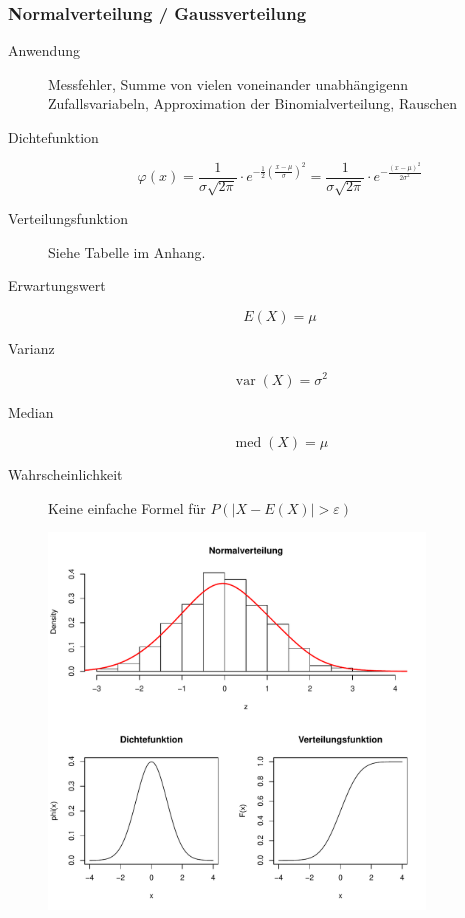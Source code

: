 \subsubsection{Normalverteilung / Gaussverteilung}
\begin{description}
  \item[Anwendung] Messfehler, Summe von vielen voneinander
    unabhängigenn Zufallsvariabeln, Approximation der
    Binomialverteilung, Rauschen
  \item[Dichtefunktion] \[\varphi(x) = \frac{1}{\sigma \sqrt{2\pi}} \cdot
    e^{-\frac{1}{2}{\left(\frac{x-\mu}{\sigma}\right)}^2} =
    \frac{1}{\sigma \sqrt{2\pi}} \cdot e^{-\frac{(x-\mu)^2}{2\sigma^2}}\]
  \item[Verteilungsfunktion] Siehe Tabelle im Anhang.
  \item[Erwartungswert] \[E(X) = \mu\]
  \item[Varianz] \[\operatorname{var}(X) = \sigma^2\]
  \item[Median] \[\operatorname{med}(X) = \mu\]
  \item[Wahrscheinlichkeit] Keine einfache Formel für
    $P(|X - E(X)| > \varepsilon)$
\end{description}
\begin{figure}[!htbp]
  \centering
  \includegraphics[width=10cm]{images/normalverteilung.pdf}
\end{figure}


